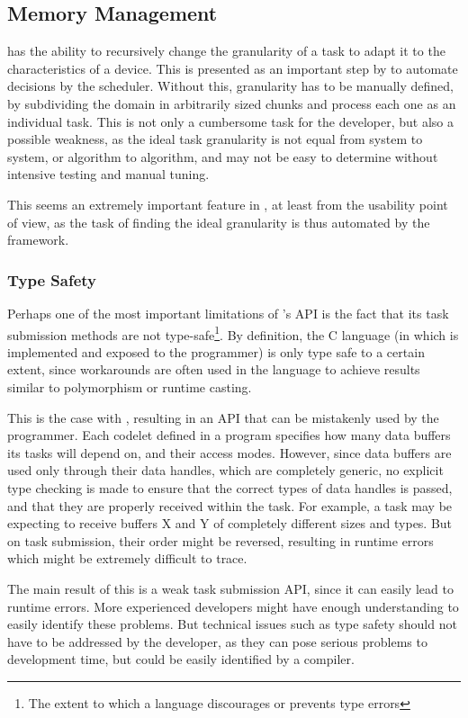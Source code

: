 \documentclass[main.tex]{subfiles}
\begin{document}
\subsection{Memory Management}

\gama has the ability to recursively change the granularity of a task to adapt it to the characteristics of a device. This is presented as an important step by \gama to automate decisions by the scheduler. Without this, granularity has to be manually defined, by subdividing the domain in arbitrarily sized chunks and process each one as an individual task. This is not only a cumbersome task for the developer, but also a possible weakness, as the ideal task granularity is not equal from system to system, or algorithm to algorithm, and may not be easy to determine without intensive testing and manual tuning.

This seems an extremely important feature in \gama, at least from the usability point of view, as the task of finding the ideal granularity is thus automated by the framework.

\subsubsection{Type Safety} \label{sec:comparison:type_safety}

Perhaps one of the most important limitations of \starpu's API is the fact that its task submission methods are not type-safe\footnote{The extent to which a language discourages or prevents type errors}. By definition, the C language (in which \starpu is implemented and exposed to the programmer) is only type safe to a certain extent, since workarounds are often used in the language to achieve results similar to polymorphism or runtime casting.

This is the case with \starpu, resulting in an API that can be mistakenly used by the programmer. Each codelet defined in a program specifies how many data buffers its tasks will depend on, and their access modes. However, since data buffers are used only through their data handles, which are completely generic, no explicit type checking is made to ensure that the correct types of data handles is passed, and that they are properly received within the task. For example, a task may be expecting to receive buffers X and Y of completely different sizes and types. But on task submission, their order might be reversed, resulting in runtime errors which might be extremely difficult to trace.

The main result of this is a weak task submission API, since it can easily lead to runtime errors. More experienced developers might have enough understanding to easily identify these problems. But technical issues such as type safety should not have to be addressed by the developer, as they can pose serious problems to development time, but could be easily identified by a compiler.
\end{document}
